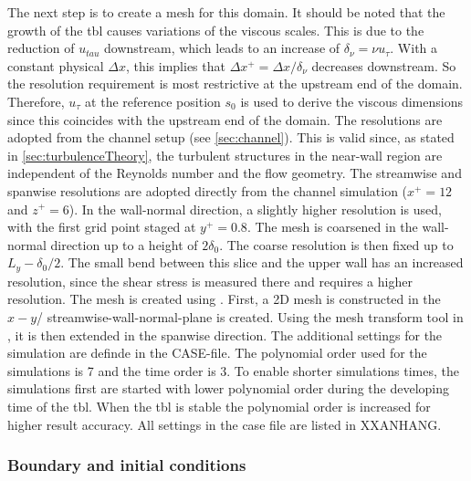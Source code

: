 The next step is to create a mesh for this domain.
It should be noted that the growth of the \acrshort{tbl} causes variations of the viscous scales.
This is  due to the reduction of $u_{tau}$ downstream, which leads to an increase of $\delta_{\nu} = \nu u_{\tau}$.
With a constant physical $\Delta x$, this implies that $\Delta x^+ = \Delta x/\delta_{\nu}$ decreases downstream.
So the resolution requirement is most restrictive at the upstream end of the domain.
Therefore, $u_{\tau}$ at the reference position $s_0$ is used to derive the viscous dimensions since this coincides with the upstream end of the domain. 
The resolutions are adopted from the channel setup (see \autoref{sec:channel}).
This is valid since, as stated in \autoref{sec:turbulenceTheory}, the turbulent structures in the near-wall region are independent of the Reynolds number and the flow geometry.
The streamwise and spanwise resolutions  are adopted directly from the channel simulation ($x^+= 12$ and $z^+ = 6$). 
In the wall-normal direction, a slightly higher resolution is used, with the first grid point staged  at $y^+ = 0.8$.
The mesh is coarsened in the wall-normal direction up to a height of $2\delta_0$.
The coarse resolution is then fixed up to $L_y - \delta_0/2$.
The small bend between this slice and the upper wall has an increased resolution, since  the shear stress is measured there and requires a higher resolution.
The mesh is created using  . 
First, a 2D mesh is constructed in the $x-y$/ streamwise-wall-normal-plane  is created. 
Using the mesh transform tool in , it is then extended in the spanwise direction. 
The additional settings for the simulation are definde in the CASE-file. 
The polynomial order used for the simulations is 7 and the time order is 3.
To enable shorter simulations times, the simulations first are started with lower polynomial order during the developing time of the \acrshort{tbl}.
When the \acrshort{tbl} is stable the polynomial order is increased for higher result accuracy.
All settings in the case file are listed in XXANHANG.

\subsubsection{Boundary and initial conditions}

